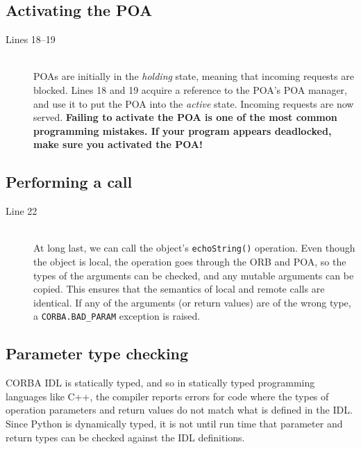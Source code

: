 \documentclass[11pt,oneside,a4paper]{book}
\newcommand{\code}[1]{\texttt{#1}}
\newcommand{\op}[1]{\texttt{#1()}}
\newcommand{\term}[1]{\textit{#1}}
\begin{document}
\subsection{Activating the POA}

\begin{description}

\item[Lines 18--19]\mbox{}\\
%
POAs are initially in the \term{holding} state, meaning that incoming
requests are blocked. Lines 18 and 19 acquire a reference to the POA's
POA manager, and use it to put the POA into the \term{active} state.
Incoming requests are now served. \textbf{Failing to activate the POA
is one of the most common programming mistakes. If your program
appears deadlocked, make sure you activated the POA!}

\end{description}


\subsection{Performing a call}

\begin{description}

\item[Line 22]\mbox{}\\
%
At long last, we can call the object's \op{echoString} operation.
Even though the object is local, the operation goes through the ORB
and POA, so the types of the arguments can be checked, and any mutable
arguments can be copied. This ensures that the semantics of local and
remote calls are identical. If any of the arguments (or return values)
are of the wrong type, a \code{CORBA.BAD\_PARAM} exception is raised.

\end{description}


\subsection{Parameter type checking}

CORBA IDL is statically typed, and so in statically typed programming
languages like C++, the compiler reports errors for code where the
types of operation parameters and return values do not match what is
defined in the IDL. Since Python is dynamically typed, it is not until
run time that parameter and return types can be checked against the
IDL definitions.
\end{document}
